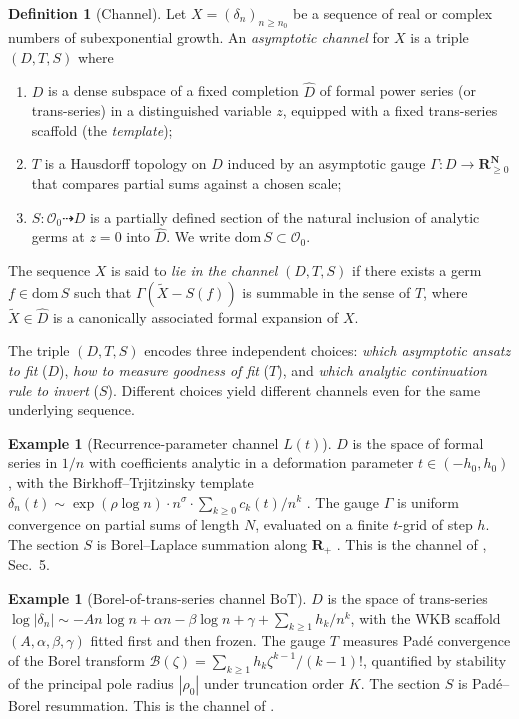\documentclass[11pt,reqno]{amsart}
\theoremstyle{plain}
\theoremstyle{definition}
\newtheorem{definition}[theorem]{Definition}
\newtheorem{example}[theorem]{Example}
\theoremstyle{remark}
\newcommand{\Lt}{L(t)}
\newcommand{\BoT}{\mathrm{BoT}}
\newcommand{\dn}{\delta_{n}}
\newcommand{\Borel}{\mathcal{B}}
\begin{document}
\begin{definition}[Channel]\label{def:channel}
Let $X = (\dn)_{n \geq n_0}$ be a sequence of real or
complex numbers of subexponential growth. An
\emph{asymptotic channel} for $X$ is a triple $(D, T, S)$
where
\begin{enumerate}
\item $D$ is a dense subspace of a fixed completion
$\widehat{D}$ of formal power series (or trans-series)
in a distinguished variable $z$, equipped with a fixed
trans-series scaffold (the \emph{template});
\item $T$ is a Hausdorff topology on $D$ induced by an
asymptotic gauge $\Gamma : D \to \mathbf{R}_{\ge 0}^{\mathbf{N}}$
that compares partial sums against a chosen scale;
\item $S : \mathcal{O}_0 \dashrightarrow D$ is a partially
defined section of the natural inclusion of analytic
germs at $z=0$ into $\widehat{D}$. We write
$\mathrm{dom}\, S \subset \mathcal{O}_0$.
\end{enumerate}
The sequence $X$ is said to \emph{lie in the channel}
$(D,T,S)$ if there exists a germ $f \in \mathrm{dom}\, S$
such that $\Gamma(\widetilde X - S(f))$ is summable in the
sense of $T$, where $\widetilde X \in \widehat D$ is a
canonically associated formal expansion of $X$.
\end{definition}

The triple $(D,T,S)$ encodes three independent choices:
\emph{which asymptotic ansatz to fit} ($D$),
\emph{how to measure goodness of fit} ($T$), and
\emph{which analytic continuation rule to invert} ($S$).
Different choices yield different channels even for the same
underlying sequence.

\begin{example}[Recurrence-parameter channel $\Lt$]
\label{ex:lt}
$D$ is the space of formal series in $1/n$ with coefficients
analytic in a deformation parameter $t \in (-h_0, h_0)$, with
the Birkhoff--Trjitzinsky template
$\dn(t) \sim \exp(\rho \log n) \cdot n^\sigma \cdot
\sum_{k \ge 0} c_k(t)/n^k$
\cite{birkhofftrjitzinsky1932analytic, wimp1984computation}.
The gauge $\Gamma$ is uniform convergence on partial sums of
length $N$, evaluated on a finite $t$-grid of step $h$. The
section $S$ is Borel--Laplace summation along $\mathbf{R}_+$
\cite{costin2008asymptotics}. This is the channel of
\cite{siarc_pcf1_v13}, Sec.~5.
\end{example}

\begin{example}[Borel-of-trans-series channel $\BoT$]
\label{ex:bot}
$D$ is the space of trans-series
$\log|\dn| \sim -A n \log n + \alpha n - \beta \log n
+ \gamma + \sum_{k \ge 1} h_k / n^k$,
with the WKB scaffold $(A,\alpha,\beta,\gamma)$ fitted first
and then frozen. The gauge $T$ measures Pad\'e convergence
of the Borel transform
$\Borel(\zeta) = \sum_{k \ge 1} h_k \zeta^{k-1}/(k-1)!$,
quantified by stability of the principal pole radius
$|\rho_0|$ under truncation order $K$. The section $S$ is
Pad\'e--Borel resummation. This is the channel of
\cite{siarc_borel_5x, siarc_borel_kscan}.
\end{example}
\end{document}
